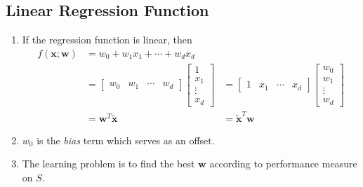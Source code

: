 \documentclass[11pt]{article}
\begin{document}
\subsection{Linear Regression Function}
\begin{enumerate}
\item If the regression function is linear, then 
\begin{align*}
f(\mathbf{x}; \mathbf{w}) &= w_{0} + w_1 x_1 + \cdots + w_d x_d\\
&= \begin{bmatrix}
w_0& w_1& \cdots& w_d
\end{bmatrix} \begin{bmatrix}
1\\
x_1\\
\vdots\\
x_d
\end{bmatrix} &= \begin{bmatrix}
1 & x_1& \cdots& x_d
\end{bmatrix} \begin{bmatrix}
w_0\\
w_1\\
\vdots\\
w_d
\end{bmatrix}\\
&= \mathbf{w}^{T} \mathbf{\tilde{x}} &= \mathbf{\tilde{x}}^{T} \mathbf{w}
\end{align*}
\item $w_0$ is the \textit{bias} term which serves as an offset.
\item The learning problem is to find the best $\mathbf{w}$ according to performance measure on $S$.
\end{enumerate}
\end{document}
